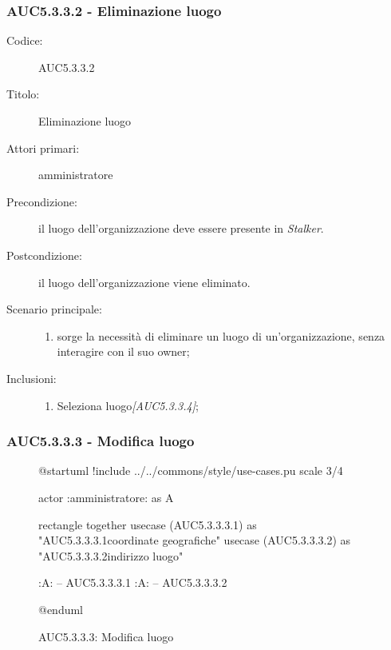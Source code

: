 \documentclass[../../../analisi-dei-requisiti.tex]{subfiles}
\begin{document}
\subsubsection{AUC5.3.3.2 - Eliminazione luogo}%
\label{subsub:AUC5.3.3.2}
\begin{description}
  \item[Codice:] AUC5.3.3.2
  \item[Titolo:] Eliminazione luogo
  \item[Attori primari:] amministratore
  \item[Precondizione:] il luogo dell'organizzazione deve essere presente in \emph{Stalker}.
  \item[Postcondizione:] il luogo dell'organizzazione viene eliminato.
  \item[Scenario principale:]
  \begin{enumerate}
    \item sorge la necessità di eliminare un luogo di un'organizzazione, senza interagire con il suo owner;
  \end{enumerate}
  \item[Inclusioni:]
  \begin{enumerate}
    \item Seleziona luogo\emph{[AUC5.3.3.4]};
  \end{enumerate}
\end{description}

\subsubsection{AUC5.3.3.3 - Modifica luogo}%
\label{subsub:AUC5.3.3.3}

\begin{figure}[h!]
  \centering
  \begin{plantuml}
  @startuml
  !include ../../commons/style/use-cases.pu
  scale 3/4

  actor :amministratore: as A

  rectangle {
    together {
      usecase (AUC5.3.3.3.1) as "AUC5.3.3.3.1\nModifica coordinate geografiche"
      usecase (AUC5.3.3.3.2) as "AUC5.3.3.3.2\nModifica indirizzo luogo"
    }
  }

  :A: -- AUC5.3.3.3.1
  :A: -- AUC5.3.3.3.2

  @enduml
  \end{plantuml}
  \caption{AUC5.3.3.3: Modifica luogo}
  \label{fig:AUC5_3_3_3}
\end{figure}
\end{document}
